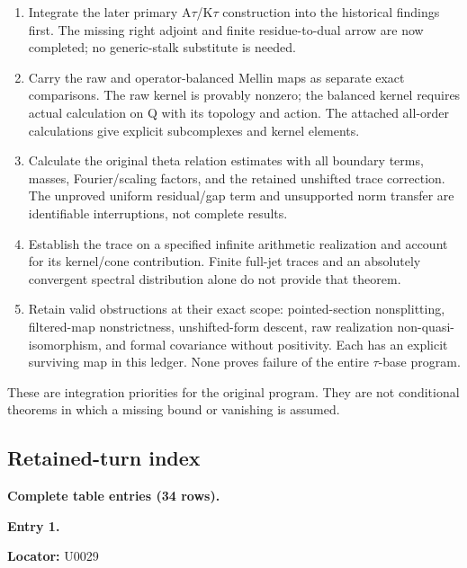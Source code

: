 \documentclass[10pt,a4paper,oneside]{report}
\providecommand{\tightlist}{\setlength{\itemsep}{0pt}\setlength{\parskip}{0pt}}
\begin{document}
\begin{enumerate}
\def\labelenumi{\arabic{enumi}.}
\tightlist
\item
  Integrate the later primary
  A\allowbreak{}\ensuremath{τ}\allowbreak{}/K\allowbreak{}\ensuremath{τ}\allowbreak{}
  construction into the historical findings first. The missing right
  adjoint and finite residue-to-dual arrow are now completed; no
  generic-stalk substitute is needed.
\item
  Carry the raw and operator-balanced Mellin maps as separate exact
  comparisons. The raw kernel is provably nonzero; the balanced kernel
  requires actual calculation on Q with its topology and action. The
  attached all-order calculations give explicit subcomplexes and kernel
  elements.
\item
  Calculate the original theta relation estimates with all boundary
  terms, masses, Fourier/scaling factors, and the retained unshifted
  trace correction. The unproved uniform residual/gap term and
  unsupported norm transfer are identifiable interruptions, not complete
  results.
\item
  Establish the trace on a specified infinite arithmetic realization and
  account for its kernel/cone contribution. Finite full-jet traces and
  an absolutely convergent spectral distribution alone do not provide
  that theorem.
\item
  Retain valid obstructions at their exact scope: pointed-section
  nonsplitting, filtered-map nonstrictness, unshifted-form descent, raw
  realization non-quasi-isomorphism, and formal covariance without
  positivity. Each has an explicit surviving map in this ledger. None
  proves failure of the entire
  \allowbreak{}\ensuremath{τ}\allowbreak{}-base program.
\end{enumerate}

These are integration priorities for the original program. They are not
conditional theorems in which a missing bound or vanishing is assumed.

\subsection{Retained-turn index}\label{retained-turn-index}

\textbf{Complete table entries (34 rows).}


\textbf{Entry 1.}

\textbf{Locator:} U0029
\end{document}
